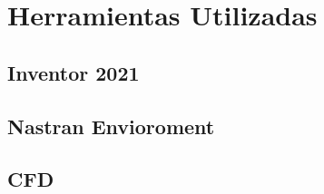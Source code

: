 \chapter{Herramientas Utilizadas}

\section{Inventor 2021}

\section{Nastran Envioroment}

\section{CFD}